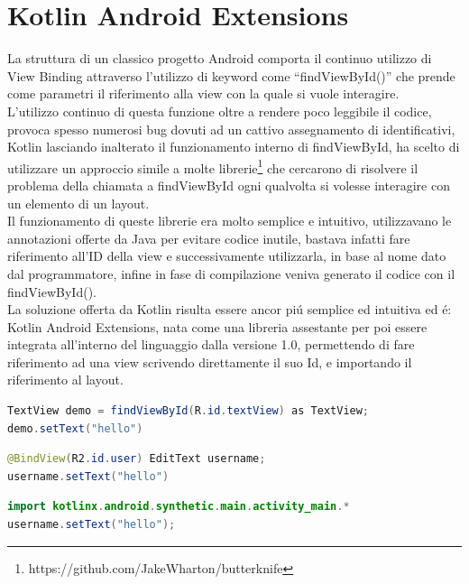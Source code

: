 \section{ Kotlin Android Extensions }
La struttura di un classico progetto Android comporta il continuo utilizzo di View Binding attraverso l'utilizzo di keyword come ``findViewById()'' che prende come parametri il riferimento alla view con la quale si vuole interagire. \\
L'utilizzo continuo di questa funzione oltre a rendere poco leggibile il codice, provoca spesso numerosi bug dovuti ad un cattivo assegnamento di identificativi, Kotlin lasciando inalterato il funzionamento interno di findViewById, ha scelto di utilizzare un approccio simile a molte librerie\footnote{https://github.com/JakeWharton/butterknife} che cercarono di risolvere il problema della chiamata a findViewById ogni qualvolta si volesse interagire con un elemento di un layout.\\
Il funzionamento di queste librerie era molto semplice e intuitivo, utilizzavano le annotazioni offerte da Java per evitare codice inutile, bastava infatti fare riferimento all'ID della view e successivamente utilizzarla, in base al nome dato dal programmatore, infine in fase di compilazione veniva generato il codice con il findViewById().\\
La soluzione offerta da Kotlin risulta essere ancor pi\'u semplice ed intuitiva ed \'e: Kotlin Android Extensions, nata come una libreria assestante per poi essere integrata all'interno del linguaggio dalla versione 1.0, permettendo di fare riferimento ad una view scrivendo direttamente il suo Id, e importando il riferimento al layout.

\begin{lstlisting}[language=java,caption={Esempio Java}]
TextView demo = findViewById(R.id.textView) as TextView;
demo.setText("hello")
\end{lstlisting}

\begin{lstlisting}[language=java,caption={Esempio Java + Libreria esterna}]
@BindView(R2.id.user) EditText username;
username.setText("hello")
\end{lstlisting}

\begin{lstlisting}[language=java,caption={Esempio KAE}]
import kotlinx.android.synthetic.main.activity_main.*
username.setText("hello");
\end{lstlisting}

\clearpage{\pagestyle{empty}\cleardoublepage}
